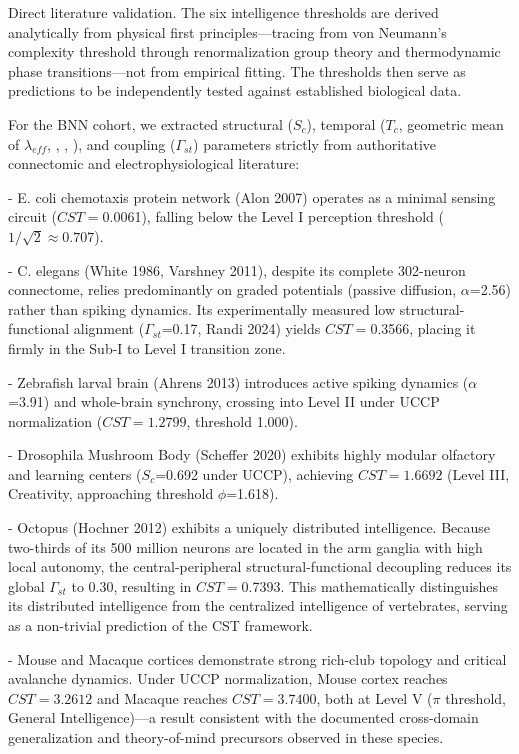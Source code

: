 \documentclass[a4paper,12pt]{article}
\begin{document}
Direct literature validation. The six intelligence thresholds are derived analytically from physical first principles---tracing from von Neumann's complexity threshold through renormalization group theory and thermodynamic phase transitions---not from empirical fitting. The thresholds then serve as predictions to be independently tested against established biological data.


For the BNN cohort, we extracted structural ($S_{c}$), temporal ($T_{c}$, geometric mean of $\lambda_{eff}$, \Phi, \Psi, \Theta), and coupling ($\Gamma_{st}$) parameters strictly from authoritative connectomic and electrophysiological literature:


- E. coli chemotaxis protein network (Alon 2007) operates as a minimal sensing circuit ($CST = $0.0061), falling below the Level I perception threshold ($1/\sqrt{2} \approx 0.707$).


- C. elegans (White 1986, Varshney 2011), despite its complete 302-neuron connectome, relies predominantly on graded potentials (passive diffusion, $\alpha$=2.56) rather than spiking dynamics. Its experimentally measured low structural-functional alignment ($\Gamma_{st}$=0.17, Randi 2024) yields $CST = $0.3566, placing it firmly in the Sub-I to Level I transition zone.


- Zebrafish larval brain (Ahrens 2013) introduces active spiking dynamics ($\alpha$=3.91) and whole-brain synchrony, crossing into Level II under UCCP normalization ($CST = 1.2799$, threshold 1.000).


- Drosophila Mushroom Body (Scheffer 2020) exhibits highly modular olfactory and learning centers ($S_{c}$=0.692 under UCCP), achieving $CST = 1.6692$ (Level III, Creativity, approaching threshold $\phi$=1.618).


- Octopus (Hochner 2012) exhibits a uniquely distributed intelligence. Because two-thirds of its 500 million neurons are located in the arm ganglia with high local autonomy, the central-peripheral structural-functional decoupling reduces its global $\Gamma_{st}$ to 0.30, resulting in $CST = $0.7393. This mathematically distinguishes its distributed intelligence from the centralized intelligence of vertebrates, serving as a non-trivial prediction of the CST framework.


- Mouse and Macaque cortices demonstrate strong rich-club topology and critical avalanche dynamics. Under UCCP normalization, Mouse cortex reaches $CST = 3.2612$ and Macaque reaches $CST = 3.7400$, both at Level V ($\pi$ threshold, General Intelligence)---a result consistent with the documented cross-domain generalization and theory-of-mind precursors observed in these species.
\end{document}
